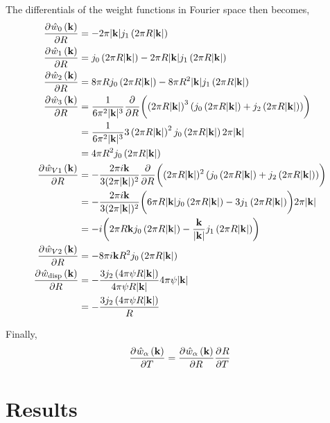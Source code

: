 \documentclass[12pt, letterpaper]{article}
\newcommand*{\pd}[3][]{\frac{\partial^{#1}#2}{\partial{#3}^{#1}}}%
\newcommand*{\lb}{\ensuremath{\left(}}
\newcommand*{\rb}{\ensuremath{\right)}}
\begin{document}
The differentials of the weight functions in Fourier space then becomes,
\begin{align}
  \label{eq:weight_functions_fourier_diff}
  \pd{\hat{w}_0 \lb \mathbf{k}\rb}{R} &= - 2 \pi |\mathbf{k}| j_1\lb 2 \pi R |\mathbf{k}| \rb  \\
  \pd{\hat{w}_1 \lb \mathbf{k}\rb}{R} &= j_0\lb 2 \pi R |\mathbf{k}| \rb - 2 \pi R |\mathbf{k}| j_1\lb 2 \pi R |\mathbf{k}| \rb \\
  \pd{\hat{w}_2 \lb \mathbf{k}\rb}{R} &= 8 \pi R j_0\lb 2 \pi R |\mathbf{k}| \rb - 8 \pi R^2 |\mathbf{k}| j_1\lb 2 \pi R |\mathbf{k}| \rb  \\
  \pd{\hat{w}_3 \lb \mathbf{k}\rb}{R}  &=  \frac{1}{6 \pi^2 |\mathbf{k}|^3} \pd{}{R}\biggl( \lb 2 \pi R |\mathbf{k}|\rb ^3 \lb j_0\lb 2 \pi R |\mathbf{k}| \rb + j_2\lb 2 \pi R |\mathbf{k}| \rb \rb \biggr)  \nonumber \\
                                      &=  \frac{1}{6 \pi^2 |\mathbf{k}|^3} 3 \lb 2 \pi R |\mathbf{k}|\rb ^2  j_0\lb 2 \pi R |\mathbf{k}| \rb 2 \pi |\mathbf{k}| \nonumber  \\
                                      &=  4 \pi R^2 j_0\lb 2 \pi R |\mathbf{k}| \rb  \\
  \pd{\hat{w}_{V1} \lb \mathbf{k}\rb}{R} &= - \frac{2 \pi i \mathbf{k}}{3 (2 \pi |\mathbf{k}|)^2}  \pd{}{R}\biggl( (2 \pi R |\mathbf{k}|)^2 \lb j_0\lb 2 \pi R |\mathbf{k}| \rb + j_2\lb 2 \pi R |\mathbf{k}| \rb \rb \biggr) \nonumber \\
                                      &= - \frac{2 \pi i \mathbf{k}}{3 (2 \pi |\mathbf{k}|)^2} \biggl( 6 \pi R |\mathbf{k}| j_0\lb 2 \pi R |\mathbf{k}| \rb - 3 j_1\lb 2 \pi R |\mathbf{k}| \rb \biggr) 2 \pi |\mathbf{k}|  \nonumber \\
   &= - i \biggl( 2 \pi R \mathbf{k} j_0\lb 2 \pi R |\mathbf{k}| \rb - \frac{\mathbf{k}}{|\mathbf{k}|} j_1\lb 2 \pi R |\mathbf{k}| \rb \biggr)  \\
  \pd{\hat{w}_{V2} \lb \mathbf{k}\rb}{R} &= - 8 \pi i \mathbf{k} R^2 j_0\lb 2 \pi R |\mathbf{k}| \rb  \\
  \pd{\hat{w}_{\rm{disp}} \lb \mathbf{k}\rb}{R} &= -\frac{3 j_2\lb 4 \pi \psi R |\mathbf{k}| \rb}{4 \pi \psi R |\mathbf{k}|} 4 \pi \psi |\mathbf{k}| \nonumber \\
                                      &= -\frac{3 j_2\lb 4 \pi \psi R |\mathbf{k}| \rb}{R}
\end{align}

Finally,
\begin{equation}
  \pd{\hat{w}_\alpha \lb \mathbf{k}\rb}{T} = \pd{\hat{w}_\alpha \lb \mathbf{k}\rb}{R} \pd{R}{T}
\end{equation}

\section{Results}



\clearpage


\end{document}
